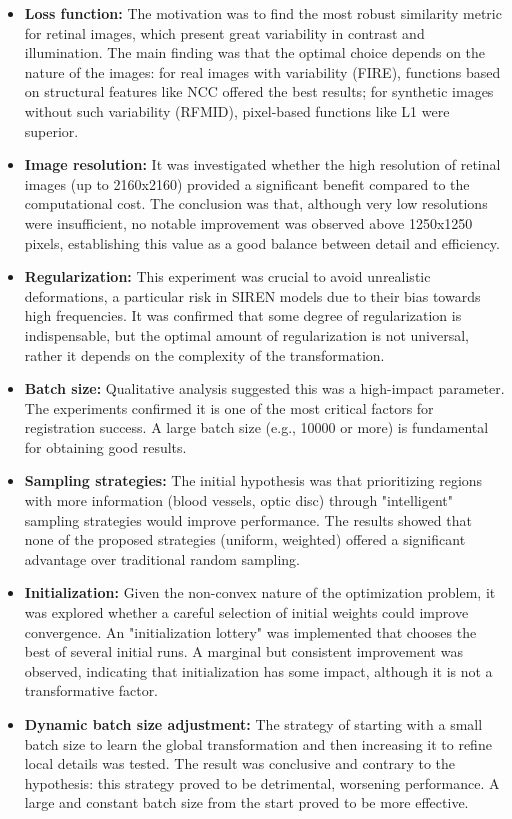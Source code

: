 \begin{itemize}
\item \textbf{Loss function:} The motivation was to find the most robust similarity metric for retinal images, which present great variability in contrast and illumination. The main finding was that the optimal choice depends on the nature of the images: for real images with variability (FIRE), functions based on structural features like NCC offered the best results; for synthetic images without such variability (RFMID), pixel-based functions like L1 were superior.

\item \textbf{Image resolution:} It was investigated whether the high resolution of retinal images (up to 2160x2160) provided a significant benefit compared to the computational cost. The conclusion was that, although very low resolutions were insufficient, no notable improvement was observed above 1250x1250 pixels, establishing this value as a good balance between detail and efficiency.

\item \textbf{Regularization:} This experiment was crucial to avoid unrealistic deformations, a particular risk in SIREN models due to their bias towards high frequencies. It was confirmed that some degree of regularization is indispensable, but the optimal amount of regularization is not universal, rather it depends on the complexity of the transformation.

\item \textbf{Batch size:} Qualitative analysis suggested this was a high-impact parameter. The experiments confirmed it is one of the most critical factors for registration success. A large batch size (e.g., 10000 or more) is fundamental for obtaining good results.

\item \textbf{Sampling strategies:} The initial hypothesis was that prioritizing regions with more information (blood vessels, optic disc) through "intelligent" sampling strategies would improve performance. The results showed that none of the proposed strategies (uniform, weighted) offered a significant advantage over traditional random sampling.

\item \textbf{Initialization:} Given the non-convex nature of the optimization problem, it was explored whether a careful selection of initial weights could improve convergence. An "initialization lottery" was implemented that chooses the best of several initial runs. A marginal but consistent improvement was observed, indicating that initialization has some impact, although it is not a transformative factor.

\item \textbf{Dynamic batch size adjustment:} The strategy of starting with a small batch size to learn the global transformation and then increasing it to refine local details was tested. The result was conclusive and contrary to the hypothesis: this strategy proved to be detrimental, worsening performance. A large and constant batch size from the start proved to be more effective.

\end{itemize}

